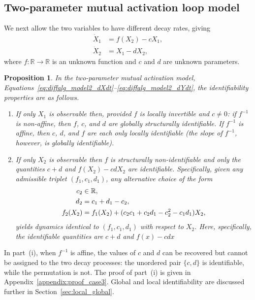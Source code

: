 \documentclass{article}
\theoremstyle{plain}
\newtheorem{proposition}{Proposition}[section]
\theoremstyle{definition}
\begin{document}
{%

\subsection{Two-parameter mutual activation loop model} \label{sec:diffalg_two_parameter}

We next allow the two variables to have different decay rates, giving
\begin{align}
    \dot{X}_1 &= f(X_2) - cX_1, \label{eq:diffalg_model2_dXdt} \\
    \dot{X}_2 &= X_1 - dX_2,   \label{eq:diffalg_model2_dYdt}
\end{align}
where $f:\mathbb{R}\to\mathbb{R}$ is an unknown function and $c$ and $d$ are unknown parameters.

\begin{proposition} \label{prop:diffalg_two_parameter_identifiability}\label{prop:diffalg_case3}\label{prop:diffalg_case4}
In the two-parameter mutual activation model, Equations~\eqref{eq:diffalg_model2_dXdt}--\eqref{eq:diffalg_model2_dYdt}, the identifiability properties are as follows.
\begin{enumerate}
    \item If only $X_1$ is observable then, provided $f$ is locally invertible and $c \neq 0$: if $f^{-1}$ is non-affine, then $f$, $c$, and $d$ are globally structurally identifiable. If $f^{-1}$ is affine, then $c$, $d$, and $f$ are each only locally identifiable (the slope of $f^{-1}$, however, is globally identifiable).
    \item If only $X_2$ is observable then $f$ is structurally non-identifiable and only the quantities $c + d$ and $f(X_2) - cdX_2$ are identifiable. Specifically, given any admissible triplet $(f_1, c_1, d_1)$, any alternative choice of the form
\begin{align}
    \label{eq:diffalg_case4_nonident_expr}
    c_2 &\in\mathbb{R}, \notag  \\
    d_2    &= c_1 + d_1 - c_2, \notag  \\
    f_2(X_2) &= f_1(X_2) + (c_2 c_1 + c_2 d_1 - c_2^2 - c_1 d_1)X_2,
\end{align}
    yields dynamics identical to $(f_1, c_1, d_1)$ with respect to $X_2$. Here, specifically, the identifiable quantities are $c+d$ and $f(x) - cdx$
\end{enumerate}
\end{proposition}

In part~(i), when $f^{-1}$ is affine, the values of $c$ and $d$ can be recovered but cannot be assigned to the two decay processes: the unordered pair $\{c,d\}$ is identifiable, while the permutation is not. The proof of part~(i) is given in Appendix~\ref{appendix:proof_case3}. Global and local identifiability are discussed further in Section~\ref{sec:local_global}.

}
\end{document}
